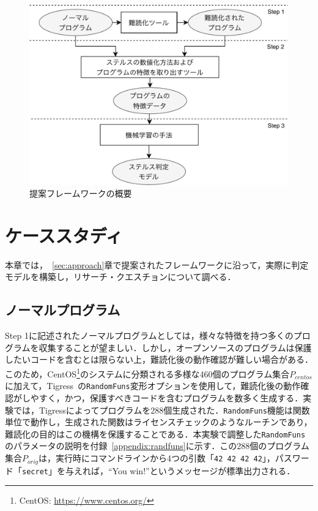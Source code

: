 \documentclass[12pt]{jarticle}
\begin{document}
\begin{figure}[hb]
 \centering
 \includegraphics[width=12cm]{framework.pdf}
 \caption{提案フレームワークの概要}
 \label{fig:framework}
\end{figure}

\newpage

\section{ケーススタディ} \label{sec:casestudy}
本章では，~\ref{sec:approach}章で提案されたフレームワークに沿って，実際に判定モデルを構築し，リサーチ・クエスチョンについて調べる．

\subsection{ノーマルプログラム}
Step 1に記述されたノーマルプログラムとしては，様々な特徴を持つ多くのプログラムを収集することが望ましい．しかし，オープンソースのプログラムは保護したいコードを含むとは限らない上，難読化後の動作確認が難しい場合がある．このため，CentOS\footnote{CentOS: \url{https://www.centos.org/}}のシステムに分類される多様な460個のプログラム集合$P_{centos}$に加えて，Tigress~\cite{tigress}の\texttt{RandomFuns}変形オプションを使用して，難読化後の動作確認がしやすく，かつ，保護すべきコードを含むプログラムを数多く生成する．実験では，Tigressによってプログラムを288個生成された．\texttt{RandomFuns}機能は関数単位で動作し，生成された関数はライセンスチェックのようなルーチンであり，難読化の目的はこの機構を保護することである．本実験で調整した\texttt{RandomFuns}のパラメータの説明を付録~\ref{appendix:randfuns}に示す．この288個のプログラム集合$P_{orig}$は，実行時にコマンドラインから4つの引数「\texttt{42 42 42 42}」，パスワード「\texttt{secret}」を与えれば，``You win!''というメッセージが標準出力される．
\end{document}
